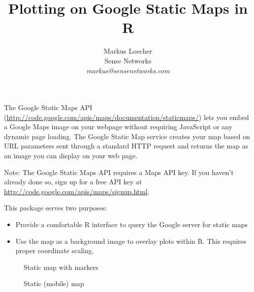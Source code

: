 \documentclass{article}
\begin{document}

\title{Plotting on Google Static Maps in R}
\author{Markus Loecher\\  Sense Networks \\  \it{markus@sensenetworks.com}}

\maketitle
\noindent
The Google Static Maps API (\url{http://code.google.com/apis/maps/documentation/staticmaps/}) lets you embed a Google Maps image on your webpage without requiring JavaScript or any dynamic page loading. The Google Static Map service creates your map based on URL parameters sent through a standard HTTP request and returns the map as an image you can display on your web page.

\noindent Note: The Google Static Maps API requires a Maps API key. If you haven't already done so, sign up for a free API key at \url{http://code.google.com/apis/maps/signup.html}.

\noindent This package serves two purposes:
\begin{itemize}
\item  Provide a comfortable R interface to query the Google server for static maps 
\item Use the map as a background image to overlay plots within R. This requires proper coordinate scaling.
\end{itemize}
\begin{figure}[ht]
\begin{minipage}[b]{0.5\linewidth}
\centering
    \caption{Static map with markers}
\end{minipage}
\begin{minipage}[b]{0.5\linewidth}
\centering
{}
    \caption{Static (mobile) map}
\end{minipage}
\end{figure}
\end{document}
